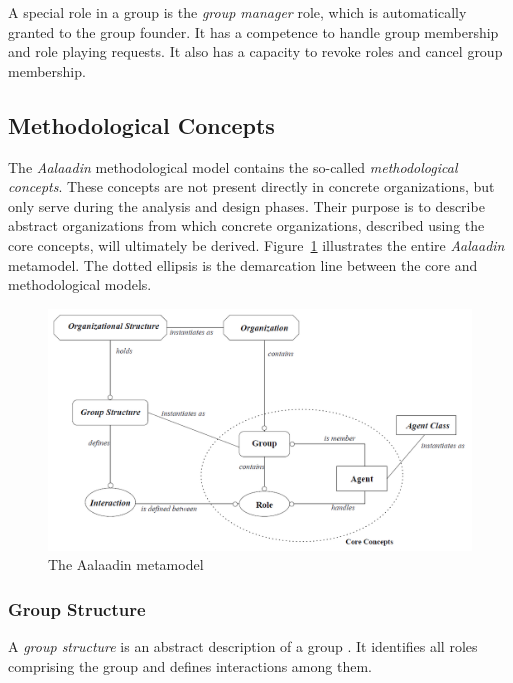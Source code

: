A special role in a group is the \textit{group manager} role, which is automatically granted to the group founder.
It has a competence to handle group membership and role playing requests.
It also has a capacity to revoke roles and cancel group membership.

\subsection{Methodological Concepts}

The \textit{Aalaadin} methodological model contains the so-called \textit{methodological concepts}.
These concepts are not present directly in concrete organizations, but only serve during the analysis and design phases.
Their purpose is to describe abstract organizations from which concrete organizations, described using the core concepts, will ultimately be derived.
Figure~\ref{figure:aalaadin-metamodel} illustrates the entire \textit{Aalaadin} metamodel. The dotted ellipsis is the demarcation line between the core and methodological models.

\begin{figure}[h]
	\centering
	\includegraphics[width=\textwidth]{images/aalaadin/aalaadin-metamodel.png}
	\caption{The Aalaadin metamodel \cite{Ferber97}}
	\label{figure:aalaadin-metamodel}
\end{figure}

\subsubsection*{Group Structure}

A \textit{group structure} is an abstract description of a group \cite{Ferber97}.
It identifies all roles comprising the group and defines interactions among them.


